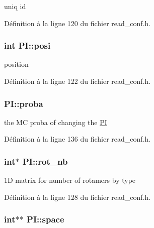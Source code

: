 uniq id 



Définition à la ligne 120 du fichier read\+\_\+conf.\+h.

\hypertarget{struct_p_i_a9e85457e1a500295d0cb90343850477b}{
\subsubsection[{posi}]{\setlength{\rightskip}{0pt plus 5cm}int P\+I\+::posi}}\label{struct_p_i_a9e85457e1a500295d0cb90343850477b}


position 



Définition à la ligne 122 du fichier read\+\_\+conf.\+h.

\hypertarget{struct_p_i_a74c23a2ec90e005366f6b1bda1b0cdb7}{
\subsubsection[{proba}]{ P\+I\+::proba}}\label{struct_p_i_a74c23a2ec90e005366f6b1bda1b0cdb7}


the M\+C proba of changing the \hyperlink{struct_p_i}{P\+I} 



Définition à la ligne 136 du fichier read\+\_\+conf.\+h.

\hypertarget{struct_p_i_a1bc33fdfb4ad3f30c03e48d1410031ce}{
\subsubsection[{rot\+\_\+nb}]{\setlength{\rightskip}{0pt plus 5cm}int$\ast$ P\+I\+::rot\+\_\+nb}}\label{struct_p_i_a1bc33fdfb4ad3f30c03e48d1410031ce}


1\+D matrix for number of rotamers by type 



Définition à la ligne 128 du fichier read\+\_\+conf.\+h.

\hypertarget{struct_p_i_a21eeeb2f51ed38c4a9eb79cdc4e2a4be}{
\subsubsection[{space}]{\setlength{\rightskip}{0pt plus 5cm}int$\ast$$\ast$ P\+I\+::space}}\label{struct_p_i_a21eeeb2f51ed38c4a9eb79cdc4e2a4be}


